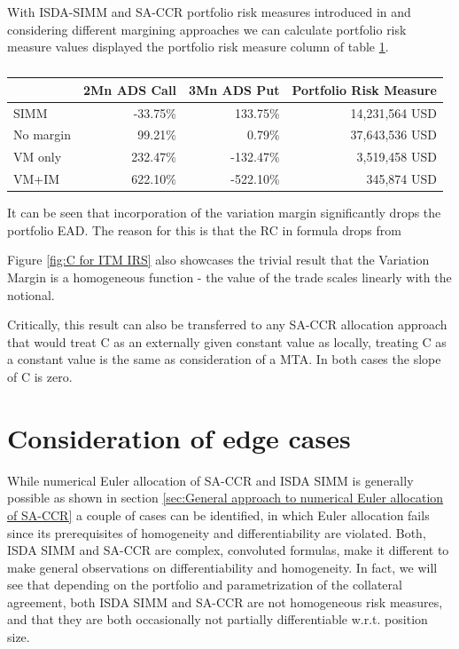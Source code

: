 \documentclass[../Thesis_AHoecherl.tex]{subfiles}
\begin{document}
    With ISDA-SIMM and SA-CCR portfolio risk measures introduced in  and considering different margining approaches we can calculate portfolio risk measure values displayed the portfolio risk measure column of table \ref{tab:2TradeEquityResults}.
    \begin{table}[htbp]
        \centering
        \begin{tabular}{l||r|r|r}
                & 2Mn ADS Call & 3Mn ADS Put & Portfolio Risk Measure\\
                \toprule
        SIMM  & -33.75\% & 133.75\% & 14,231,564 USD \\
        No margin & 99.21\% & 0.79\% & 37,643,536 USD \\
        VM only & 232.47\% & -132.47\% & 3,519,458 USD \\
        VM+IM & 622.10\% & -522.10\% & 345,874 USD \\
        \end{tabular}%
        \caption{}
        \label{tab:2TradeEquityResults}%
    \end{table}%
    It can be seen that incorporation of the variation margin significantly drops the portfolio EAD. The reason for this is that the RC in formula  drops from 


    Figure \ref{fig:C for ITM IRS} also showcases the trivial result that the Variation Margin is a homogeneous function - the value of the trade scales linearly with the notional.
    
    Critically, this result can also be transferred to any SA-CCR allocation approach that would treat C as an externally given constant value as locally, treating C as a constant value is the same as consideration of a \gls{MTA}. 
    In both cases the slope of C is zero.  

    \section{Consideration of edge cases\label{sec:Consideration of edge cases}}

    While numerical Euler allocation of SA-CCR and ISDA SIMM is generally possible as shown in section \ref{sec:General approach to numerical Euler allocation of SA-CCR} a couple of cases can be identified, in which Euler allocation fails since its prerequisites of homogeneity and differentiability are violated.
    Both, ISDA SIMM and SA-CCR are complex, convoluted formulas, make it different to make general observations on differentiability and homogeneity.
    In fact, we will see that depending on the portfolio and parametrization of the collateral agreement, both ISDA SIMM and SA-CCR are not homogeneous risk measures, and that they are both occasionally not partially differentiable w.r.t. position size.
\end{document}
